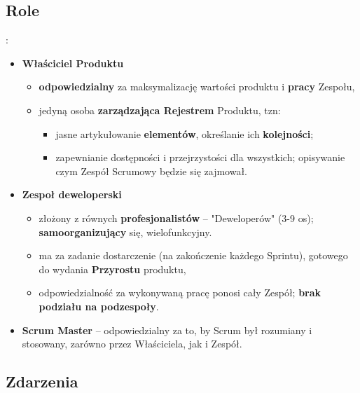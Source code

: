 \documentclass[main.tex]{subfiles}
\begin{document}
    \subsection{Role}:
    \begin{itemize}
        \item \textbf{Właściciel Produktu}
        \begin{itemize}[noitemsep]
            \item \textbf{odpowiedzialny} za maksymalizację wartości produktu i \textbf{pracy} Zespołu,
            \item jedyną osoba \textbf{zarządzająca Rejestrem} Produktu, tzn:
            \begin{itemize}[noitemsep]
                \item jasne artykułowanie \textbf{elementów}, określanie ich \textbf{kolejności};
                \item zapewnianie dostępności i przejrzystości dla wszystkich; opisywanie czym
                Zespół Scrumowy będzie się zajmował.
            \end{itemize}
        \end{itemize}

        \item \textbf{Zespoł deweloperski}
        \begin{itemize}[noitemsep]
            \item złożony z równych \textbf{profesjonalistów} -- "Deweloperów" (3-9 os); \textbf{samoorganizujący} się, wielofunkcyjny.
            \item ma za zadanie dostarczenie (na zakończenie każdego Sprintu), gotowego do wydania \textbf{Przyrostu}
            produktu,
            \item odpowiedzialność za wykonywaną pracę ponosi cały Zespół; \textbf{brak podziału na podzespoły}.
        \end{itemize}

        \item \textbf{Scrum Master} -- odpowiedzialny za to, by Scrum był rozumiany i stosowany, zarówno przez Właściciela,
        jak i Zespół.
    \end{itemize}

    \subsection{Zdarzenia}
\end{document}
